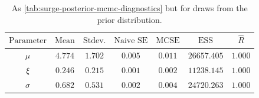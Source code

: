 \documentclass[ef,draft]{agutexSI2019}
\begin{document}
\begin{table}[h]
      \centering
      \caption{As \cref{tab:surge-posterior-mcmc-diagnostics} but for draws from the prior distribution.}\label{tab:surge-prior-mcmc-diagnostics}
      \begin{tabular}{ccccccc}
            \toprule
            $\textrm{Parameter}$ & $\textrm{Mean}$ & $\textrm{Stdev.}$ & $\textrm{Naive SE}$ & $\textrm{MCSE}$ & $\textrm{ESS}$ & $\hat{R}$ \\
            \midrule
            $\mu$                & $4.774$         & $1.702$           & $0.005$             & $0.011$         & $26657.405$    & $1.000$   \\
            $\xi$                & $0.246$         & $0.215$           & $0.001$             & $0.002$         & $11238.145$    & $1.000$   \\
            $\sigma$             & $0.682$         & $0.531$           & $0.002$             & $0.004$         & $24720.263$    & $1.000$   \\
            \bottomrule
      \end{tabular}

\end{table}
\end{document}
